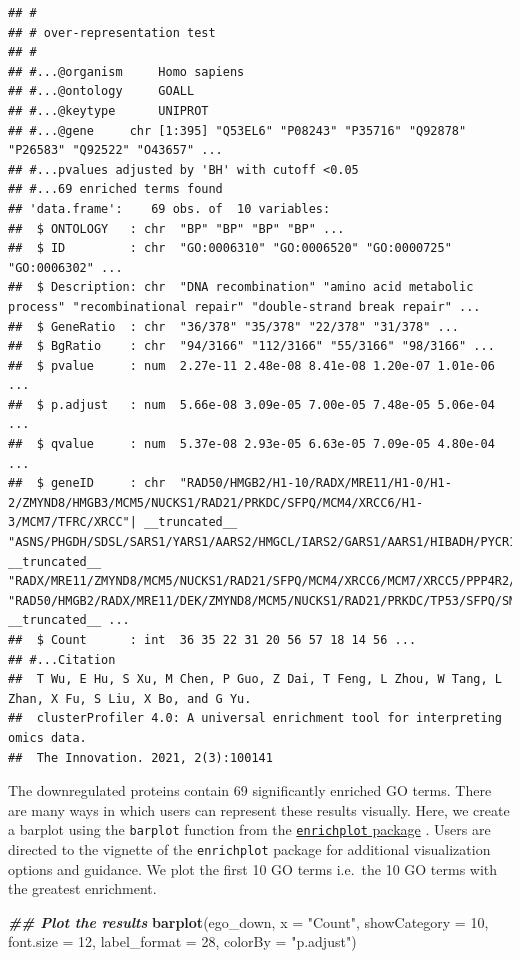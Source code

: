 \documentclass[9pt,a4paper,]{extarticle}
\newenvironment{Shaded}{\begin{snugshade}}{\end{snugshade}}
\newcommand{\AttributeTok}[1]{\textcolor[rgb]{0.13,0.29,0.53}{#1}}
\newcommand{\DecValTok}[1]{\textcolor[rgb]{0.00,0.00,0.81}{#1}}
\newcommand{\DocumentationTok}[1]{\textcolor[rgb]{0.56,0.35,0.01}{\textbf{\textit{#1}}}}
\newcommand{\FunctionTok}[1]{\textcolor[rgb]{0.13,0.29,0.53}{\textbf{#1}}}
\newcommand{\NormalTok}[1]{#1}
\newcommand{\StringTok}[1]{\textcolor[rgb]{0.31,0.60,0.02}{#1}}
\begin{document}
\begin{verbatim}
## #
## # over-representation test
## #
## #...@organism     Homo sapiens 
## #...@ontology     GOALL 
## #...@keytype      UNIPROT 
## #...@gene     chr [1:395] "Q53EL6" "P08243" "P35716" "Q92878" "P26583" "Q92522" "O43657" ...
## #...pvalues adjusted by 'BH' with cutoff <0.05 
## #...69 enriched terms found
## 'data.frame':    69 obs. of  10 variables:
##  $ ONTOLOGY   : chr  "BP" "BP" "BP" "BP" ...
##  $ ID         : chr  "GO:0006310" "GO:0006520" "GO:0000725" "GO:0006302" ...
##  $ Description: chr  "DNA recombination" "amino acid metabolic process" "recombinational repair" "double-strand break repair" ...
##  $ GeneRatio  : chr  "36/378" "35/378" "22/378" "31/378" ...
##  $ BgRatio    : chr  "94/3166" "112/3166" "55/3166" "98/3166" ...
##  $ pvalue     : num  2.27e-11 2.48e-08 8.41e-08 1.20e-07 1.01e-06 ...
##  $ p.adjust   : num  5.66e-08 3.09e-05 7.00e-05 7.48e-05 5.06e-04 ...
##  $ qvalue     : num  5.37e-08 2.93e-05 6.63e-05 7.09e-05 4.80e-04 ...
##  $ geneID     : chr  "RAD50/HMGB2/H1-10/RADX/MRE11/H1-0/H1-2/ZMYND8/HMGB3/MCM5/NUCKS1/RAD21/PRKDC/SFPQ/MCM4/XRCC6/H1-3/MCM7/TFRC/XRCC"| __truncated__ "ASNS/PHGDH/SDSL/SARS1/YARS1/AARS2/HMGCL/IARS2/GARS1/AARS1/HIBADH/PYCR1/MCCC2/ACADSB/DHFR/MARS1/SLC25A12/ETFA/PS"| __truncated__ "RADX/MRE11/ZMYND8/MCM5/NUCKS1/RAD21/SFPQ/MCM4/XRCC6/MCM7/XRCC5/PPP4R2/POGZ/YY1/MCM3/MCM2/VPS72/PARP1/BRD8/MCM6/FUS/RECQL" "RAD50/HMGB2/RADX/MRE11/DEK/ZMYND8/MCM5/NUCKS1/RAD21/PRKDC/TP53/SFPQ/SMARCC2/MCM4/XRCC6/HPF1/MCM7/XRCC5/HMGB1/PP"| __truncated__ ...
##  $ Count      : int  36 35 22 31 20 56 57 18 14 56 ...
## #...Citation
##  T Wu, E Hu, S Xu, M Chen, P Guo, Z Dai, T Feng, L Zhou, W Tang, L Zhan, X Fu, S Liu, X Bo, and G Yu.
##  clusterProfiler 4.0: A universal enrichment tool for interpreting omics data.
##  The Innovation. 2021, 2(3):100141
\end{verbatim}

The downregulated proteins contain 69 significantly enriched GO
terms. There are many ways in which users can represent these results visually.
Here, we create a barplot using the \texttt{barplot} function from the \href{https://bioconductor.org/packages/release/bioc/html/enrichplot.html}{\texttt{enrichplot} package}
\citep{enrichplot}. Users are directed to the vignette of the \texttt{enrichplot} package
for additional visualization options and guidance. We plot the first 10 GO terms
i.e.~the 10 GO terms with the greatest enrichment.

\begin{Shaded}
\begin{Highlighting}[]
\DocumentationTok{\#\# Plot the results}
\FunctionTok{barplot}\NormalTok{(ego\_down,}
        \AttributeTok{x =} \StringTok{"Count"}\NormalTok{,}
        \AttributeTok{showCategory =} \DecValTok{10}\NormalTok{,}
        \AttributeTok{font.size =} \DecValTok{12}\NormalTok{,}
        \AttributeTok{label\_format =} \DecValTok{28}\NormalTok{,}
        \AttributeTok{colorBy =} \StringTok{"p.adjust"}\NormalTok{)}
\end{Highlighting}
\end{Shaded}
\end{document}

